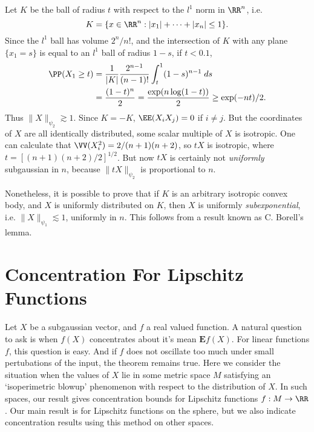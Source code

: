 \begin{example}
    Let $K$ be the ball of radius $t$ with respect to the $l^1$ norm in $\RR^n$, i.e.
    \[ K = \{ x \in \RR^n: |x_1| + \dots + |x_n| \leq 1 \}. \]
    Since the $l^1$ ball has volume $2^n/n!$, and the intersection of $K$ with any plane $\{ x_1 = s \}$ is equal to an $l^1$ ball of radius $1 - s$, if $t < 0.1$,
    \begin{align*}
        \PP(X_1 \geq t) &= \frac{1}{|K|} \frac{2^{n-1}}{(n-1)!} \int_t^1 (1-s)^{n-1}\; ds\\
        &= \frac{(1 - t)^n}{2} = \frac{\exp(n \log(1-t))}{2} \geq \exp(-nt)/2.
    \end{align*}
    Thus $\| X \|_{\psi_2} \gtrsim 1$. Since $K = -K$, $\EE(X_iX_j) = 0$ if $i \neq j$. But the coordinates of $X$ are all identically distributed, some scalar multiple of $X$ is isotropic. One can calculate that $\VV(X_i^2) = 2/(n+1)(n+2)$, so $tX$ is isotropic, where $t = [(n+1)(n+2)/2]^{1/2}$. But now $tX$ is certainly not \emph{uniformly} subgaussian in $n$, because $\| tX \|_{\psi_2}$ is proportional to $n$.
\end{example}

Nonetheless, it is possible to prove that if $K$ is an arbitrary isotropic convex body, and $X$ is uniformly distributed on $K$, then $X$ is uniformly \emph{subexponential}, i.e. $\| X \|_{\psi_1} \lesssim 1$, uniformly in $n$. This follows from a result known as C. Borell's lemma.









\section{Concentration For Lipschitz Functions}

Let $X$ be a subgaussian vector, and $f$ a real valued function. A natural question to ask is when $f(X)$ concentrates about it's mean $\mathbf{E} f(X)$. For linear functions $f$, this question is easy. And if $f$ does not oscillate too much under small pertubations of the input, the theorem remains true. Here we consider the situation when the values of $X$ lie in some metric space $M$ satisfying an `isoperimetric blowup' phenomenon with respect to the distribution of $X$. In such spaces, our result gives concentration bounds for Lipschitz functions $f: M \to \RR$. Our main result is for Lipschitz functions on the sphere, but we also indicate concentration results using this method on other spaces.


